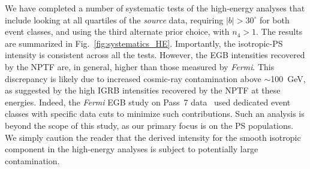 We have completed a number of systematic tests of the high-energy analyses that include looking at all quartiles of the {\it source} data, requiring $|b| > 30^\circ$ for both event classes, and using the third alternate prior choice, with $n_4 > 1$.   The results are summarized in Fig.~\ref{fig:systematics_HE}.
Importantly, the isotropic-PS intensity is consistent across all the tests.  However, the EGB intensities recovered by the NPTF are, in general, higher than those measured by \emph{Fermi}.  This discrepancy is likely due to increased cosmic-ray contamination above $\sim$100~GeV, as suggested by the high IGRB intensities recovered by the NPTF at these energies.  Indeed, the \emph{Fermi} EGB study on Pass~7 data~\cite{Ackermann:2014usa} used dedicated event classes with specific data cuts to minimize such contributions.  Such an analysis is beyond the scope of this study, as our primary focus is on the PS populations.  We simply caution the reader that the derived intensity for the smooth isotropic component in the high-energy analyses is subject to potentially large contamination.
